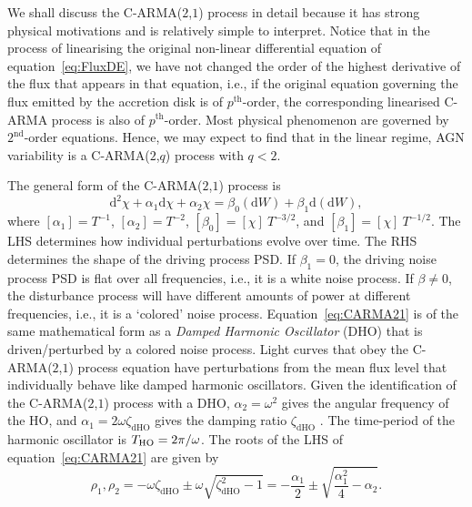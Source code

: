 \documentclass[a4paper,fleqn,usenatbib]{mnras}
\begin{document}
We shall discuss the C-ARMA($2$,$1$) process in detail because it has strong physical motivations and is relatively simple to interpret. Notice that in the process of linearising the original non-linear differential equation of equation~\eqref{eq:FluxDE}, we have not changed the order of the highest derivative of the flux that appears in that equation, i.e., if the original equation governing the flux emitted by the accretion disk is of $p^{\mathrm{th}}$-order, the corresponding linearised C-ARMA process is also of $p^{\mathrm{th}}$-order. Most physical phenomenon are governed by $2^{\mathrm{nd}}$-order equations. Hence, we may expect to find that in the linear regime, AGN variability is a C-ARMA($2$,$q$) process with $q < 2$. 

The general form of the C-ARMA($2$,$1$) process is
\begin{equation}\label{eq:CARMA21}
\mathrm{d}^{2}\chi + \alpha_{1} \mathrm{d}\chi + \alpha_{2} \chi = \beta_{0}(\mathrm{d}W) + \beta_{1} \mathrm{d}(\mathrm{d}W),
\end{equation}
where $[\alpha_{1}] = T^{-1}$, $[\alpha_{2}] = T^{-2}$, $[\beta_{0}] = [\chi]~T^{-3/2}$, and $[\beta_{1}] = [\chi]~T^{-1/2}$. The LHS determines how individual perturbations evolve over time. The RHS determines the shape of the driving process PSD. If $\beta_{1} = 0$, the driving noise process PSD is flat over all frequencies, i.e., it is a white noise process. If $\beta \neq 0$, the disturbance process will have different amounts of power at different frequencies, i.e., it is a `colored' noise process. Equation~\eqref{eq:CARMA21} is of the same mathematical form as a \textit{Damped Harmonic Oscillator} (DHO) that is driven/perturbed by a colored noise process. Light curves that obey the C-ARMA($2$,$1$) process equation have perturbations from the mean flux level that individually behave like damped harmonic oscillators.
Given the identification of the  C-ARMA($2$,$1$) process with a DHO, $\alpha_{2} = \omega^{2}$ gives the angular frequency of the HO, and $\alpha_{1} = 2\omega\zeta_{\mathrm{dHO}}$ gives the damping ratio $\zeta_{\mathrm{dHO}}$ \citep[see chapter~7 for notation]{PanditWu}. The time-period of the harmonic oscillator is $T_{\mathrm{HO}} = 2 \pi/\omega$. The roots of the LHS of equation~\eqref{eq:CARMA21} are given by
\begin{equation}\label{eq:CARMA21Roots}
\rho_{1},\rho_{2} = -\omega\zeta_{\mathrm{dHO}} \pm \omega \sqrt{\zeta_{\mathrm{dHO}}^{2} - 1} = -\frac{\alpha_{1}}{2} \pm \sqrt{\frac{\alpha_{1}^{2}}{4} - \alpha_{2}}.
\end{equation}
\end{document}
